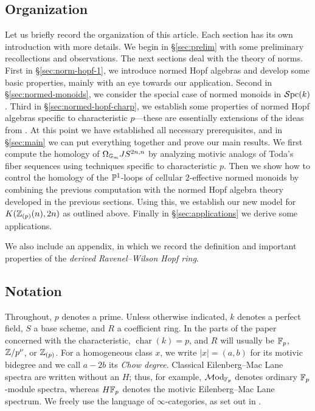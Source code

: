 \documentclass{amsart}
\numberwithin{proposition}{section}
\numberwithin{equation}{section}
\begin{document}
\subsection{Organization}
Let us briefly record the organization of this article.
Each section has its own introduction with more details.
We begin in \S\ref{sec:prelim} with some preliminary recollections and observations.
The next sections deal with the theory of norms.
First in \S\ref{sec:norm-hopf-1}, we introduce normed Hopf algebras and develop some basic properties, mainly with an eye towards our application.
Second in \S\ref{sec:normed-monoids}, we consider the special case of normed monoids in $\Spc(k)$.
Third in \S\ref{sec:normed-hopf-charp}, we establish some properties of normed Hopf algebras specific to characteristic $p$---these are essentially extensions of the ideas from \cite{bachmann-linearity}.
At this point we have established all necessary prerequisites, and in \S\ref{sec:main} we can put everything together and prove our main results.
We first compute the homology of $\Omega_\Gm JS^{2n,n}$ by analyzing motivic analogs of Toda's fiber sequences using techniques specific to characteristic $p$.
Then we show how to control the homology of the $\P^1$-loops of cellular $2$-effective normed monoids by combining the previous computation with the normed Hopf algebra theory developed in the previous sections.
Using this, we establish our new model for $K(\Z_{(p)}(n),2n)$ as outlined above.
Finally in \S\ref{sec:applications} we derive some applications.

We also include an appendix, in which we record the definition and important properties of the \emph{derived Ravenel--Wilson Hopf ring}.

\subsection{Notation}\label{subsec:notation}
Throughout, $p$ denotes a prime.  Unless otherwise indicated, $k$ denotes a perfect field, $S$ a base scheme, and $R$ a coefficient ring.
In the parts of the paper concerned with the characteristic, $\operatorname{char}(k)=p$, and $R$ will usually be $\F_p$, $\Z/p^\nu$, or $\Z_{(p)}$.
For a homogeneous class $x$, we write $|x|=(a,b)$ for its motivic bidegree and we call $a - 2b$ its \emph{Chow degree}.
Classical Eilenberg--Mac Lane spectra are written without an $H$; thus, for example, $\Mod_{\F_p}$ denotes ordinary $\F_p$-module spectra, whereas $H\F_p$ denotes the motivic Eilenberg--Mac Lane spectrum.
We freely use the language of $\infty$-categories, as set out in \cite{lurie-htt,lurie-ha}.
\end{document}
